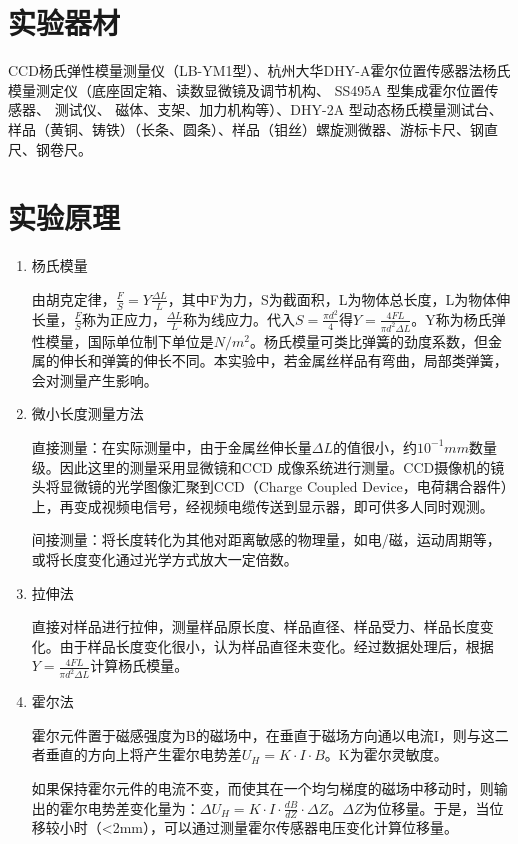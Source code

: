 \documentclass[11pt]{article}
\begin{document}
\section{实验器材}
    CCD杨氏弹性模量测量仪（LB-YM1型）、杭州大华DHY-A霍尔位置传感器法杨氏模量测定仪（底座固定箱、读数显微镜及调节机构、
    SS495A 型集成霍尔位置传感器、 测试仪、 磁体、支架、加力机构等）、DHY-2A 型动态杨氏模量测试台、
    样品（黄铜、铸铁）（长条、圆条）、样品（钼丝）螺旋测微器、游标卡尺、钢直尺、钢卷尺。
\section{实验原理}
\begin{enumerate}
    \item 杨氏模量
    \par \hspace*{2em}	
    由胡克定律，$\frac{F}{S}=Y\frac{\Delta L}{L}$，其中F为力，S为截面积，L为物体总长度，L为物体伸长量，$\frac{F}{S}$称为正应力，$\frac{\Delta L}{L}$称为线应力。代入$S=\frac{\pi d^2}{4}$得$Y=\frac{4FL}{\pi d^2\Delta L}$。Y称为杨氏弹性模量，国际单位制下单位是$N/m^2$。杨氏模量可类比弹簧的劲度系数，但金属的伸长和弹簧的伸长不同。本实验中，若金属丝样品有弯曲，局部类弹簧，会对测量产生影响。
    \item 微小长度测量方法
    \par \hspace*{2em}直接测量：在实际测量中，由于金属丝伸长量$\Delta L$的值很小，约${10}^{-1}mm$数量级。因此这里的测量采用显微镜和CCD 成像系统进行测量。CCD摄像机的镜头将显微镜的光学图像汇聚到CCD（Charge Coupled Device，电荷耦合器件）上，再变成视频电信号，经视频电缆传送到显示器，即可供多人同时观测。
    \par \hspace*{2em}间接测量：将长度转化为其他对距离敏感的物理量，如电/磁，运动周期等，或将长度变化通过光学方式放大一定倍数。
    \item 拉伸法
    \par \hspace*{2em}直接对样品进行拉伸，测量样品原长度、样品直径、样品受力、样品长度变化。由于样品长度变化很小，认为样品直径未变化。经过数据处理后，根据$Y=\frac{4FL}{\pi d^2\Delta L}$计算杨氏模量。
    \item 霍尔法
    \par \hspace*{2em} 霍尔元件置于磁感强度为B的磁场中，在垂直于磁场方向通以电流I，则与这二者垂直的方向上将产生霍尔电势差$U_H=K\cdot I\cdot B$。K为霍尔灵敏度。
    \par \hspace*{2em} 如果保持霍尔元件的电流不变，而使其在一个均匀梯度的磁场中移动时，则输出的霍尔电势差变化量为：${\Delta U}_H=K\cdot I\cdot\frac{dB}{dZ}\cdot\Delta Z$。$\Delta Z$为位移量。于是，当位移较小时（<2mm），可以通过测量霍尔传感器电压变化计算位移量。

\end{enumerate}
\end{document}
